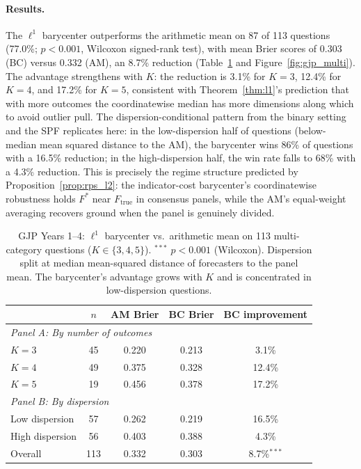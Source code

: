 \paragraph{Results.}  The $\ell^1$ barycenter outperforms the arithmetic mean on 87 of 113 questions (77.0\%; $p < 0.001$, Wilcoxon signed-rank test), with mean Brier scores of 0.303 (BC) versus 0.332 (AM), an 8.7\% reduction (Table~\ref{tab:gjp_multi} and Figure~\ref{fig:gjp_multi}).  The advantage strengthens with $K$: the reduction is 3.1\% for $K=3$, 12.4\% for $K=4$, and 17.2\% for $K=5$, consistent with Theorem~\ref{thm:l1}'s prediction that with more outcomes the coordinatewise median has more dimensions along which to avoid outlier pull.  The dispersion-conditional pattern from the binary setting and the SPF replicates here: in the low-dispersion half of questions (below-median mean squared distance to the AM), the barycenter wins 86\% of questions with a 16.5\% reduction; in the high-dispersion half, the win rate falls to 68\% with a 4.3\% reduction.  This is precisely the regime structure predicted by Proposition~\ref{prop:rps_l2}: the indicator-cost barycenter's coordinatewise robustness holds $F^*$ near $F_{\mathrm{true}}$ in consensus panels, while the AM's equal-weight averaging recovers ground when the panel is genuinely divided.

\begin{table}[ht]
\centering
\small
\begin{tabular}{lcccc}
\hline
 & $n$ & AM Brier & BC Brier & BC improvement \\
\hline
\multicolumn{5}{l}{\textit{Panel A: By number of outcomes}} \\[2pt]
$K=3$ & 45 & 0.220 & 0.213 &  3.1\% \\
$K=4$ & 49 & 0.375 & 0.328 & 12.4\% \\
$K=5$ & 19 & 0.456 & 0.378 & 17.2\% \\
\hline
\multicolumn{5}{l}{\textit{Panel B: By dispersion}} \\[2pt]
Low dispersion  & 57 & 0.262 & 0.219 & 16.5\% \\
High dispersion & 56 & 0.403 & 0.388 &  4.3\% \\
\hline
Overall & 113 & 0.332 & 0.303 & 8.7\%$^{***}$ \\
\hline
\end{tabular}
\caption{GJP Years 1--4: $\ell^1$ barycenter vs.\ arithmetic mean on 113 multi-category questions ($K\in\{3,4,5\}$).  $^{***}$ $p<0.001$ (Wilcoxon).  Dispersion split at median mean-squared distance of forecasters to the panel mean.  The barycenter's advantage grows with $K$ and is concentrated in low-dispersion questions.}
\label{tab:gjp_multi}
\end{table}

